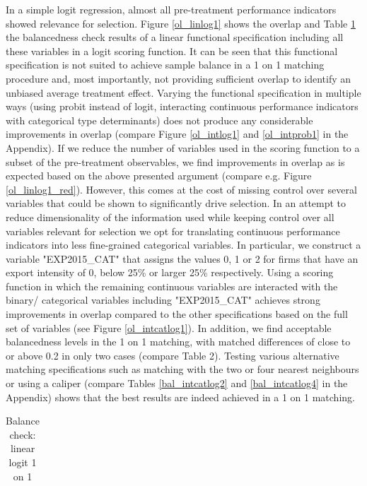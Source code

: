  In a simple logit regression, almost all pre-treatment performance indicators showed relevance for selection. Figure \ref{ol_linlog1} shows the overlap and Table \ref{bal_linlog1} the balancedness check results of a linear functional specification including all these variables in a logit scoring function. It can be seen that this functional specification is not suited to achieve sample balance in a 1 on 1 matching procedure and, most importantly, not providing sufficient overlap to identify an unbiased average treatment effect. Varying the functional specification in multiple ways (using probit instead of logit, interacting continuous performance indicators with categorical type determinants) does not produce any considerable improvements in overlap (compare Figure \ref{ol_intlog1} and \ref{ol_intprob1} in the Appendix). If we reduce the number of variables used in the scoring function to a subset of the pre-treatment observables, we find improvements in overlap as is expected based on the above presented argument (compare e.g. Figure \ref{ol_linlog1_red}). However, this comes at the cost of missing control over several variables that could be shown to significantly drive selection. In an attempt to reduce dimensionality of the information used while keeping control over all variables relevant for selection we opt for translating continuous performance indicators into less fine-grained categorical variables. In particular, we construct a variable "EXP2015\_CAT" that assigns the values 0, 1 or 2 for firms that have an export intensity of 0, below 25\% or larger 25\% respectively. Using a scoring function in which the remaining continuous variables are interacted with the binary/ categorical variables including "EXP2015\_CAT" achieves strong improvements in overlap compared to the other specifications based on the full set of variables (see Figure \ref{ol_intcatlog1}). In addition, we find acceptable balancedness levels in the 1 on 1 matching, with matched differences of close to or above 0.2 in only two cases (compare Table 2). Testing various alternative matching specifications such as matching with the two or four nearest neighbours or using a caliper (compare Tables \ref{bal_intcatlog2} and \ref{bal_intcatlog4} in the Appendix) shows that the best results are indeed achieved in a 1 on 1 matching. \\ \par

\begin{table}
	\centering
\begin{tabular}{lcccc}
	\hline \hline
	
	\hline \hline
\end{tabular}
	\caption{Balance check: linear logit 1 on 1}
	\label{bal_linlog1}
\end{table}

